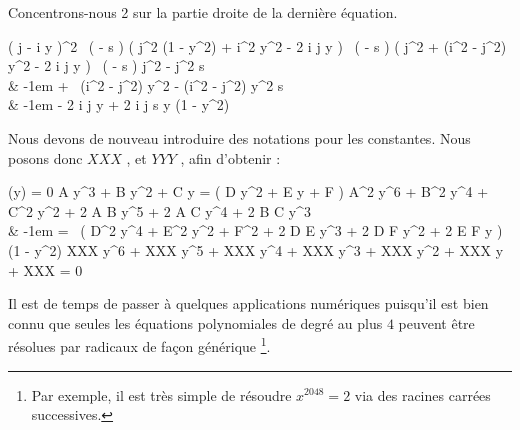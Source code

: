 \bigskip

Concentrons-nous \qty{2}{\min} sur la partie droite de la dernière équation.

\medskip

\begin{stepcalc}[style=ar*]
	\big( j  - i y \big)^2 \, \big( \alpha - s  \big)
\explnext{}
	\big( j^2 (1 - y^2) + i^2 y^2 - 2 i j y  \big) \, \big( \alpha - s  \big)
\explnext{}
	\big( j^2 + (i^2 - j^2) y^2 - 2 i j y  \big) \, \big( \alpha - s  \big)
\explnext{}
	j^2 \alpha - j^2 s 
	\\ &
	\kern-1em + \,
	(i^2 - j^2) y^2 \alpha - (i^2 - j^2) y^2 s 
	\\ &
	\kern-1em -
	2 \alpha i j y  + 2 i j s y (1 - y^2)
\end{stepcalc}


\bigskip

Nous devons de nouveau introduire des notations pour les constantes. Nous posons donc
$XXX$ ,
et
$YYY$ ,
afin d'obtenir :

\medskip

\begin{stepcalc}[style=ar*, ope = {\implies[donc]}]
	(y) = 0
\explnext{}
	A y^3 + B y^2 + C y
	=
	( D y^2 + E y + F ) 
\explnext{}
	A^2 y^6 + B^2 y^4 + C^2 y^2
	+
	2 A B y^5 + 2 A C y^4 + 2 B C y^3
	\\ &
	\kern-1em = \,
	\big( 
	    D^2 y^4 + E^2 y^2 + F^2 
	    +
	    2 D E y^3 + 2 D F y^2 + 2 E F y
	\big)
	(1 - y^2)
\explnext{}
	XXX y^6 
	+ 
	XXX y^5
	+ 
	XXX y^4
	+ 
	XXX y^3
	+ 
	XXX y^2
	+ 
	XXX y
	+ 
	XXX
	=
	0
\end{stepcalc}


\bigskip

Il est de temps de passer à quelques applications numériques puisqu'il est bien connu que seules les équations polynomiales de degré au plus $4$ peuvent être résolues par radicaux de façon générique
\footnote{
	Par exemple, il est très simple de résoudre $x^{2048} = 2$ via des racines carrées successives.
}.




